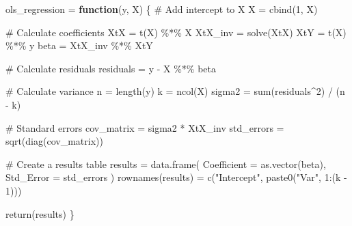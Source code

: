 \documentclass[
  letterpaper,
  DIV=11,
  numbers=noendperiod]{scrartcl}
\newenvironment{Shaded}{\begin{snugshade}}{\end{snugshade}}
\newcommand{\AttributeTok}[1]{\textcolor[rgb]{0.40,0.45,0.13}{#1}}
\newcommand{\CommentTok}[1]{\textcolor[rgb]{0.37,0.37,0.37}{#1}}
\newcommand{\ControlFlowTok}[1]{\textcolor[rgb]{0.00,0.23,0.31}{\textbf{#1}}}
\newcommand{\DecValTok}[1]{\textcolor[rgb]{0.68,0.00,0.00}{#1}}
\newcommand{\FunctionTok}[1]{\textcolor[rgb]{0.28,0.35,0.67}{#1}}
\newcommand{\NormalTok}[1]{\textcolor[rgb]{0.00,0.23,0.31}{#1}}
\newcommand{\OtherTok}[1]{\textcolor[rgb]{0.00,0.23,0.31}{#1}}
\newcommand{\SpecialCharTok}[1]{\textcolor[rgb]{0.37,0.37,0.37}{#1}}
\newcommand{\StringTok}[1]{\textcolor[rgb]{0.13,0.47,0.30}{#1}}
\begin{document}
\begin{Shaded}
\begin{Highlighting}[]
\NormalTok{ols\_regression }\OtherTok{=} \ControlFlowTok{function}\NormalTok{(y, X) \{}
  \CommentTok{\# Add intercept to X}
\NormalTok{  X }\OtherTok{=} \FunctionTok{cbind}\NormalTok{(}\DecValTok{1}\NormalTok{, X)}
  
  \CommentTok{\# Calculate coefficients}
\NormalTok{  XtX }\OtherTok{=} \FunctionTok{t}\NormalTok{(X) }\SpecialCharTok{\%*\%}\NormalTok{ X}
\NormalTok{  XtX\_inv }\OtherTok{=} \FunctionTok{solve}\NormalTok{(XtX)}
\NormalTok{  XtY }\OtherTok{=} \FunctionTok{t}\NormalTok{(X) }\SpecialCharTok{\%*\%}\NormalTok{ y}
\NormalTok{  beta }\OtherTok{=}\NormalTok{ XtX\_inv }\SpecialCharTok{\%*\%}\NormalTok{ XtY}
  
  \CommentTok{\# Calculate residuals}
\NormalTok{  residuals }\OtherTok{=}\NormalTok{ y }\SpecialCharTok{{-}}\NormalTok{ X }\SpecialCharTok{\%*\%}\NormalTok{ beta}
  
  \CommentTok{\# Calculate variance}
\NormalTok{  n }\OtherTok{=} \FunctionTok{length}\NormalTok{(y)}
\NormalTok{  k }\OtherTok{=} \FunctionTok{ncol}\NormalTok{(X)}
\NormalTok{  sigma2 }\OtherTok{=} \FunctionTok{sum}\NormalTok{(residuals}\SpecialCharTok{\^{}}\DecValTok{2}\NormalTok{) }\SpecialCharTok{/}\NormalTok{ (n }\SpecialCharTok{{-}}\NormalTok{ k)}
  
  \CommentTok{\# Standard errors}
\NormalTok{  cov\_matrix }\OtherTok{=}\NormalTok{ sigma2 }\SpecialCharTok{*}\NormalTok{ XtX\_inv}
\NormalTok{  std\_errors }\OtherTok{=} \FunctionTok{sqrt}\NormalTok{(}\FunctionTok{diag}\NormalTok{(cov\_matrix))}
  
  \CommentTok{\# Create a results table}
\NormalTok{  results }\OtherTok{=} \FunctionTok{data.frame}\NormalTok{(}
    \AttributeTok{Coefficient =} \FunctionTok{as.vector}\NormalTok{(beta),}
    \AttributeTok{Std\_Error =}\NormalTok{ std\_errors}
\NormalTok{  )}
  \FunctionTok{rownames}\NormalTok{(results) }\OtherTok{=} \FunctionTok{c}\NormalTok{(}\StringTok{"Intercept"}\NormalTok{, }\FunctionTok{paste0}\NormalTok{(}\StringTok{"Var"}\NormalTok{, }\DecValTok{1}\SpecialCharTok{:}\NormalTok{(k }\SpecialCharTok{{-}} \DecValTok{1}\NormalTok{)))}
  
  \FunctionTok{return}\NormalTok{(results)}
\NormalTok{\}}
\end{Highlighting}
\end{Shaded}
\end{document}
